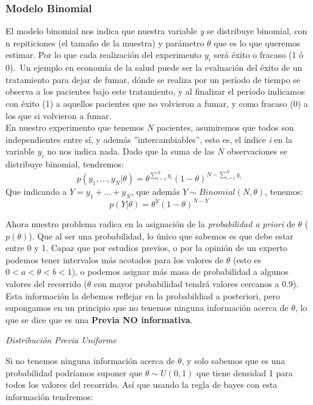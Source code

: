 \documentclass[12pt]{article}
\begin{document}
\subsubsection{Modelo Binomial}

El modelo binomial nos indica que nuestra variable \textit{y} se distribuye binomial, con n repiticiones (el tamaño de la muestra) y parámetro $\theta$ que es lo que queremos estimar. Por lo que cada realización del experimento $y_i$ será éxito o fracaso (1 ó 0).\
Un ejemplo en economía de la salud puede ser la evaluación del éxito de un tratamiento para dejar de fumar, dónde se realiza por un período de tiempo se observa a los pacientes bajo este tratamiento, y al finalizar el período indicamos con éxito (1) a aquellos pacientes que no volvieron a fumar, y como fracaso (0) a los que si volvieron a fumar.\\

En nuestro experimento que tenemos $N$ pacientes, asumiremos que todos son independientes entre sí, y además ''intercambiables'', esto es, el índice \textit{i} en la variable $y_i$ no nos indica nada. Dado que la suma de las $N$ observaciones se distribuye binomial, tendremos:\\

\[
p(y_1,\ldots,y_N|\theta)=\theta^{\sum_{i=1}^Ny_i}(1-\theta)^{N-\sum_{i=1}^Ny_i}
\]
Que indicando a $Y=y_1+\ldots+y_N$, que además $Y\sim Binomial(N,\theta)$, tenemos:\\

\[
p(Y|\theta)=\theta^Y(1-\theta)^{N-Y}
\]

Ahora nuestro problema radica en la asignación de la \textit{probabilidad a priori} de $\theta$ ($p(\theta)$). Que al ser una probabilidad, lo único que sabemos es que debe estar entre 0 y 1. Capaz que por estudios previos, o por la opinión de un experto podemos tener intervalos más acotados para los valores de $\theta$ (esto es $0<a<\theta<b<1$), o podemos asignar más masa de probabilidad a algunos valores del recorrido ($\theta$ con mayor probabilidad tendrá valores cercanos a 0.9). Esta información la debemos reflejar en la probabildiad a posteriori, pero supongamos en un principio que no tenemos ninguna información acerca de $\theta$, lo que se dice que es una \textbf{Previa NO informativa}.

\begin{center}
	\textit{Distribución Previa Uniforme}
\end{center}

Si no tenemos ninguna información acerca de $\theta$, y solo sabemos que es una probabilidad podríamos suponer que $\theta \sim U(0,1)$ que tiene densidad 1 para todos los valores del recorrido. Así que usando la regla de bayes con esta información tendremos:\\
\end{document}
